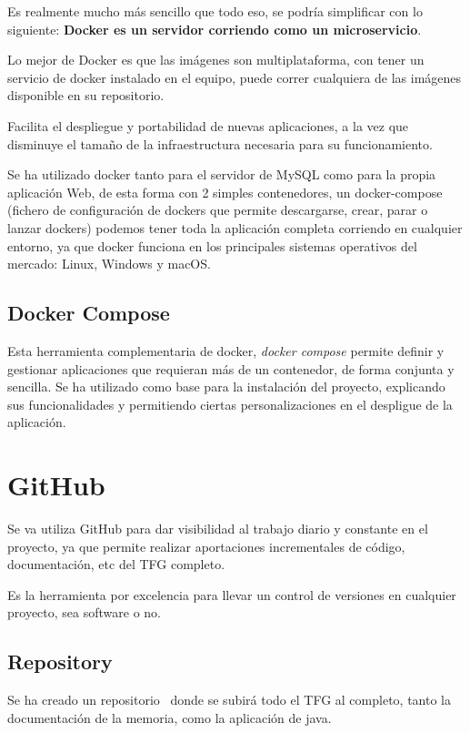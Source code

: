 Es realmente mucho más sencillo que todo eso, se podría simplificar con lo siguiente: \textbf{Docker es un servidor corriendo como un microservicio}.

Lo mejor de Docker es que las imágenes son multiplataforma, con tener un servicio de docker instalado en el equipo, puede correr cualquiera de las imágenes disponible en su repositorio.

Facilita el despliegue y portabilidad de nuevas aplicaciones, a la vez que disminuye el tamaño de la infraestructura necesaria para su funcionamiento.

Se ha utilizado docker tanto para el servidor de MySQL como para la propia aplicación Web, de esta forma con 2 simples contenedores, un docker-compose (fichero de configuración de dockers que permite descargarse, crear, parar o lanzar dockers) podemos tener toda la aplicación completa corriendo en cualquier entorno, ya que docker funciona en los principales sistemas operativos del mercado: Linux, Windows y macOS.

\subsection{Docker Compose}

Esta herramienta complementaria de docker, \textit{docker compose} \cite{web:dockercompose} permite definir y gestionar aplicaciones que requieran más de un contenedor, de forma conjunta y sencilla.
Se ha utilizado como base para la instalación del proyecto, explicando sus funcionalidades y permitiendo ciertas personalizaciones en el despligue de la aplicación.

\section{GitHub}

Se va utiliza GitHub para dar visibilidad al trabajo diario y constante en el proyecto, ya que permite realizar aportaciones incrementales de código, documentación, etc del TFG completo.

Es la herramienta por excelencia para llevar un control de versiones en cualquier proyecto, sea software o no.

\subsection{Repository}

Se ha creado un repositorio~\cite{github:repo} donde se subirá todo el TFG al completo, tanto la documentación de la memoria, como la aplicación de java.

